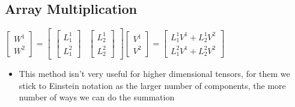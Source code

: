 \subsection{Array Multiplication}
$\begin{bmatrix}
W^{1}\\
W^{2}
\end{bmatrix} = \begin{bmatrix}
\begin{bmatrix}
L^{1}_{1} \\
L^{2}_{1}
\end{bmatrix} & \begin{bmatrix}
L^{1}_{2} \\
L^{2}_{2}
\end{bmatrix}
\end{bmatrix} \begin{bmatrix}
V^{1}\\
V^{2}
\end{bmatrix} = \begin{bmatrix}
L^{1}_{1} V^{1} + L^{1}_{2} V^{2}\\
L^{2}_{1} V^{1} + L^{2}_{2} V^{2}
\end{bmatrix}$
\begin{itemize}
\item This method isn't very useful for higher dimensional tensors, for them we stick to Einstein notation as the larger number of components, the more number of ways we can do the summation
\end{itemize}
